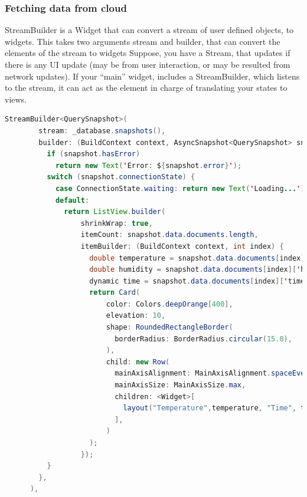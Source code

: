 \subsubsection{Fetching data from cloud}

StreamBuilder is a Widget that can convert a stream of user defined objects, to widgets. This takes two arguments stream and builder, that can convert the elements of the stream to widgets
Suppose, you have a Stream, that updates if there is any UI update (may be from user interaction, or may be resulted from network updates). If your “main” widget, includes a StreamBuilder, which listens to the stream, it can act as the element in charge of translating your states to views.

\begin{lstlisting}[language=java, caption = Getting data from cloud database to flutter UI]
StreamBuilder<QuerySnapshot>(
        stream: _database.snapshots(),
        builder: (BuildContext context, AsyncSnapshot<QuerySnapshot> snapshot) {
          if (snapshot.hasError)
            return new Text('Error: ${snapshot.error}');
          switch (snapshot.connectionState) {
            case ConnectionState.waiting: return new Text('Loading...');
            default:
              return ListView.builder(
                  shrinkWrap: true,
                  itemCount: snapshot.data.documents.length,
                  itemBuilder: (BuildContext context, int index) {
                    double temperature = snapshot.data.documents[index]['temperature'];
                    double humidity = snapshot.data.documents[index]['humidity'];
                    dynamic time = snapshot.data.documents[index]['time'].toDate();
                    return Card(
                        color: Colors.deepOrange[400],
                        elevation: 10,
                        shape: RoundedRectangleBorder(
                          borderRadius: BorderRadius.circular(15.0),
                        ),
                        child: new Row(
                          mainAxisAlignment: MainAxisAlignment.spaceEvenly,
                          mainAxisSize: MainAxisSize.max,
                          children: <Widget>[
                            layout("Temperature",temperature, "Time", time, "Humidity", humidity),
                          ],
                        )
                    );
                  });
          }
        },
      ),

\end{lstlisting}

